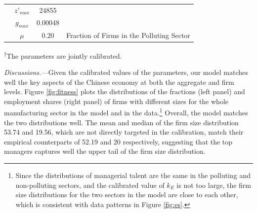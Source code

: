 \documentclass[AEJ]{AEA}
\begin{document}
\begin{table}[t]
\begin{tabular}{lccl}
                  & $z'_{max}$        & 24855         &                                                             \\
                  & $g_{max}$         & 0.00048       &                                                             \\
                  & $\mu$             & 0.20          & Fraction of Firms in the Polluting Sector                   \\
    \hline
\end{tabular}
\begin{tablenotes}
     \textsuperscript{$\dagger$}The parameters are jointly calibrated.
\end{tablenotes}
\label{tab:calibration}
\end{table}

\textit{Discussions.---}Given the calibrated values of the parameters, our model matches well the key aspects of the Chinese economy at both the aggregate and firm levels. Figure \ref{fig:fitness} plots the distributions of the fractions (left panel) and employment shares (right panel) of firms with different sizes for the whole manufacturing sector in the model and in the data.\footnote{Since the distributions of managerial talent are the same in the polluting and non-polluting sectors, and the calibrated value of  $k_E$ is not too large, the firm size distributions for the two sectors in the model are close to each other, which is consistent with data patterns in Figure \ref{fig:es}.} Overall, the model matches the two distributions well. The mean and median of the firm size distribution 53.74 and 19.56, which are not directly targeted in the calibration, match their empirical counterparts of 52.19 and 20 respectively, suggesting that the top managers captures well the upper tail of the firm size distribution.
\end{document}
